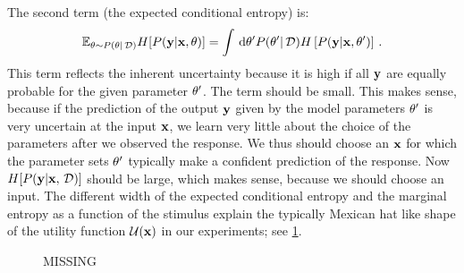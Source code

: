The second term (the expected conditional entropy) is:
\begin{align}
	\mathbb{E}_{\theta \sim {P(\theta| \,\mathcal{D})}} H[{P({\bf y} | {\bf x}, \theta)}]
	= \int \,\mathrm{d} \theta' {P(\theta'|\,\mathcal{D})} H\left[{P({\bf y} | {\bf x}, \theta')}\right] \,.
\end{align} 
This term reflects the inherent uncertainty because it is high if all ${\bf y}$ are equally probable for the given parameter $\theta'$. The term should be small. This makes sense, because if the prediction of the output ${\bf y}$ given by the model parameters $\theta'$ is very uncertain at the input ${\bf x}$, we learn very little about the choice of the parameters after we observed the response. We thus should choose an ${\bf x}$ for which the parameter sets $\theta'$ typically make a confident prediction of the response.
Now $H[{P({\bf y} | {\bf x}, \,\mathcal{D})}]$ should be large, which makes sense, because we should choose an input.
The different width of the expected conditional entropy and the marginal entropy as a function of the stimulus explain the typically Mexican hat like shape of the utility function $\mathcal{U}({\bf x})$ in our experiments; see \cref{fig:utility_function}.

\begin{figure}
	\centering
	\caption{MISSING}\label{fig:utility_function}
\end{figure}
